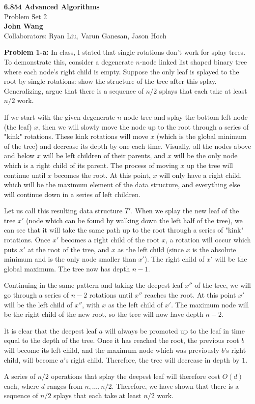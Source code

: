 \documentclass[psamsfonts]{amsart}
\newenvironment{sol}{\vspace{0.25cm}{\large \bfseries Solution:}}{\qedsymbol}
\newenvironment{prob}[1]{\begin{framed}{\large \bfseries Problem #1:}}{\end{framed}}
\newcommand{\makenewtitle}{
\begin{center}
{\huge \bfseries 6.854 Advanced Algorithms} \\
Problem Set 2\\
\vspace{0.25cm}
{\bfseries John Wang} \\
Collaborators: Ryan Liu, Varun Ganesan, Jason Hoch
\end{center}
\vspace{0.5cm}
}
\begin{document}
\makenewtitle
\begin{prob}{1-a}
In class, I stated that single rotations don't work for splay trees. To demonstrate this, consider a degenerate $n$-node linked list shaped binary tree where each node's right child is empty. Suppose the only leaf is splayed to the root by single rotations: show the structure of the tree after this splay. Generalizing, argue that there is a sequence of $n/2$ splays that each take at least $n/2$ work.
\end{prob}

\begin{sol}
If we start with the given degenerate $n$-node tree and splay the bottom-left node (the leaf) $x$, then we will slowly move the node up to the root through a series of "kink" rotations. These kink rotations will move $x$ (which is the global minimum of the tree) and decrease its depth by one each time. Visually, all the nodes above and below $x$ will be left children of their parents, and $x$ will be the only node which is a right child of its parent. The process of moving $x$ up the tree will continue until $x$ becomes the root. At this point, $x$ will only have a right child, which will be the maximum element of the data structure, and everything else will continue down in a series of left children.

Let us call this resulting data structure $T'$. When we splay the new leaf of the tree $x'$ (node which can be found by walking down the left half of the tree), we can see that it will take the same path up to the root through a series of "kink" rotations. Once $x'$ becomes a right child of the root $x$, a rotation will occur which puts $x'$ at the root of the tree, and $x$ as the left child (since $x$ is the absolute minimum and is the only node smaller than $x'$). The right child of $x'$ will be the global maximum. The tree now has depth $n-1$.

Continuing in the same pattern and taking the deepest leaf $x''$ of the tree, we will go through a series of $n-2$ rotations until $x''$ reaches the root. At this point $x'$ will be the left child of $x''$, with $x$ as the left child of $x'$. The maximum node will be the right child of the new root, so the tree will now have depth $n-2$. 

It is clear that the deepest leaf $a$ will always be promoted up to the leaf in time equal to the depth of the tree. Once it has reached the root, the previous root $b$ will become its left child, and the maximum node which was previously $b$'s right child, will become $a$'s right child. Therefore, the tree will decrease in depth by $1$. 

A series of $n/2$ operations that splay the deepest leaf will therefore cost $O(d)$ each, where $d$ ranges from $n, \ldots, n/2$. Therefore, we have shown that there is a sequence of $n/2$ splays that each take at least $n/2$ work.
\end{sol}
\end{document}
